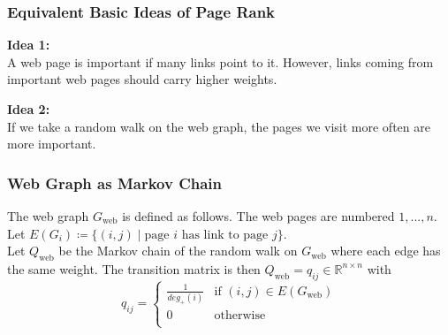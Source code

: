 \documentclass[english]{panikzettel}
\begin{document}
\begin{halfboxl}
\vspace{-\baselineskip}

\subsubsection{Equivalent Basic Ideas of Page Rank}
\textbf{Idea 1:}\\
A web page is important if many links point to it. However, links coming from important web pages should carry higher weights.

\textbf{Idea 2:}\\
If we take a random walk on the web graph, the pages we visit more often are more important.

\end{halfboxl}
\begin{halfboxr}
\vspace{-\baselineskip}

\subsubsection{Web Graph as Markov Chain}
The web graph $G_{\text{web}}$ is defined as follows. The web pages are numbered $1,...,n$.
Let $E(G_i)\coloneqq \{(i,j) \mid \text{page } i \text{ has link to page } j\}$.\\
Let $Q_{\text{web}}$ be the Markov chain of the random walk on $G_{\text{web}}$ where each edge has the same weight. The transition matrix is then $Q_{\text{web}}=q_{ij}\in\mathbb{R}^{n\times n}$  with
\[
q_{ij}=
\begin{cases}
\frac{1}{deg_{+}(i)} & \text{if }(i,j)\in E(G_{\text{web}})  \\
0 & \text{otherwise} \\
\end{cases}
\]
\end{halfboxr}
\end{document}
